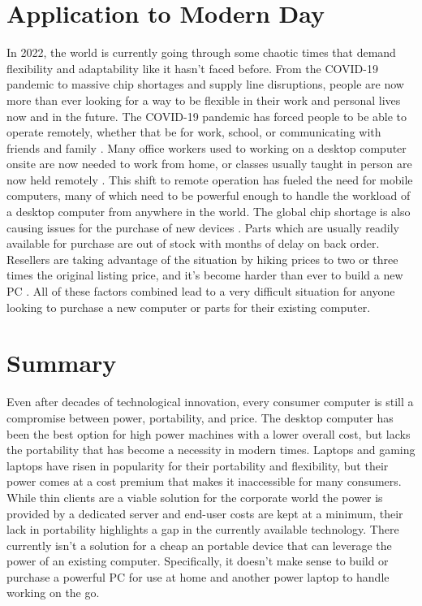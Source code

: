 \section{Application to Modern Day}\label{sec:ApplicationToModernDay}

In 2022, the world is currently going through some chaotic times that demand flexibility and adaptability like it hasn't faced before.
From the COVID-19 pandemic to massive chip shortages and supply line disruptions, people are now more than ever looking for a way to be flexible in their work and personal lives now and in the future.
The COVID-19 pandemic has forced people to be able to operate remotely, whether that be for work, school, or communicating with friends and family \cite{levanon_2020}.
Many office workers used to working on a desktop computer onsite are now needed to work from home, or classes usually taught in person are now held remotely \cite{ASU_covid_19}.
This shift to remote operation has fueled the need for mobile computers, many of which need to be powerful enough to handle the workload of a desktop computer from anywhere in the world.
The global chip shortage is also causing issues for the purchase of new devices \cite{chipshortage_jpmorgan}.
Parts which are usually readily available for purchase are out of stock with months of delay on back order.
Resellers are taking advantage of the situation by hiking prices to two or three times the original listing price, and it's become harder than ever to build a new PC \cite{tamarov_2021}.
All of these factors combined lead to a very difficult situation for anyone looking to purchase a new computer or parts for their existing computer.


\section{Summary}\label{sec:BackgroundSummary}

Even after decades of technological innovation, every consumer computer is still a compromise between power, portability, and price.
The desktop computer has been the best option for high power machines with a lower overall cost, but lacks the portability that has become a necessity in modern times.
Laptops and gaming laptops have risen in popularity for their portability and flexibility, but their power comes at a cost premium that makes it inaccessible for many consumers.
While thin clients are a viable solution for the corporate world the power is provided by a dedicated server and end-user costs are kept at a minimum, their lack in portability highlights a gap in the currently available technology.
There currently isn't a solution for a cheap an portable device that can leverage the power of an existing computer.
Specifically, it doesn't make sense to build or purchase a powerful PC for use at home and another power laptop to handle working on the go.